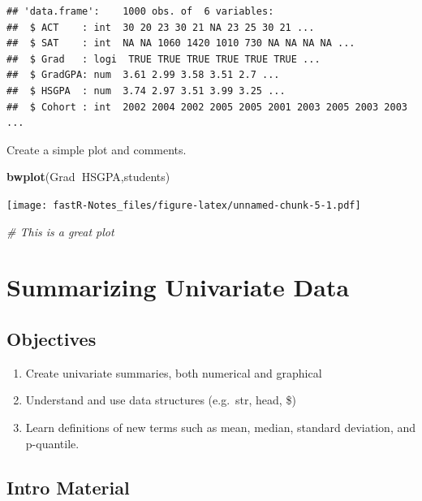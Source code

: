 \documentclass[]{book}
\newenvironment{Shaded}{\begin{snugshade}}{\end{snugshade}}
\newcommand{\KeywordTok}[1]{\textcolor[rgb]{0.13,0.29,0.53}{\textbf{#1}}}
\newcommand{\CommentTok}[1]{\textcolor[rgb]{0.56,0.35,0.01}{\textit{#1}}}
\newcommand{\OperatorTok}[1]{\textcolor[rgb]{0.81,0.36,0.00}{\textbf{#1}}}
\newcommand{\NormalTok}[1]{#1}
\providecommand{\tightlist}{%
  \setlength{\itemsep}{0pt}\setlength{\parskip}{0pt}}
\theoremstyle{definition}
\theoremstyle{definition}
\theoremstyle{definition}
\theoremstyle{remark}
\begin{document}
\begin{verbatim}
## 'data.frame':    1000 obs. of  6 variables:
##  $ ACT    : int  30 20 23 30 21 NA 23 25 30 21 ...
##  $ SAT    : int  NA NA 1060 1420 1010 730 NA NA NA NA ...
##  $ Grad   : logi  TRUE TRUE TRUE TRUE TRUE TRUE ...
##  $ GradGPA: num  3.61 2.99 3.58 3.51 2.7 ...
##  $ HSGPA  : num  3.74 2.97 3.51 3.99 3.25 ...
##  $ Cohort : int  2002 2004 2002 2005 2005 2001 2003 2005 2003 2003 ...
\end{verbatim}

Create a simple plot and comments.

\begin{Shaded}
\begin{Highlighting}[]
\KeywordTok{bwplot}\NormalTok{(Grad}\OperatorTok{~}\NormalTok{HSGPA,students)}
\end{Highlighting}
\end{Shaded}

\texttt{[image: fastR-Notes\_files/figure-latex/unnamed-chunk-5-1.pdf]}

\begin{Shaded}
\begin{Highlighting}[]
\CommentTok{# This is a great plot}
\end{Highlighting}
\end{Shaded}

\hypertarget{Les2}{\section{Summarizing Univariate Data}\label{Les2}}

\subsection{Objectives}\label{objectives-1}

\begin{enumerate}
\def\labelenumi{\arabic{enumi}.}
\tightlist
\item
  Create univariate summaries, both numerical and graphical
\item
  Understand and use data structures (e.g.~str, head, \$)
\item
  Learn definitions of new terms such as mean, median, standard
  deviation, and p-quantile.
\end{enumerate}

\subsection{Intro Material}\label{intro-material}
\end{document}
